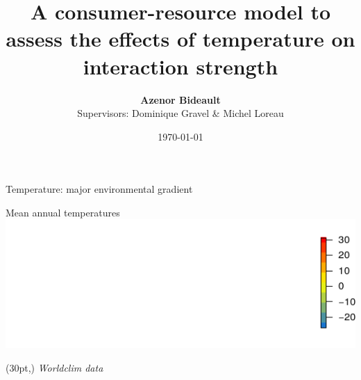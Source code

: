 \documentclass[11pt, compress, aspectratio=1610]{beamer}
\title{A consumer-resource model to assess the effects of temperature on
interaction strength}
\subtitle{}
\date{\today}
\author{\textbf{Azenor Bideault}\\
Supervisors: Dominique Gravel \& Michel Loreau \newline}
\institute{Université de Sherbooke}
\newcommand\smallcitation[1]{%
\begin{textblock*}{\textwidth}(30pt,\textheight)
    \raggedleft \small\textit{#1}
\end{textblock*}}
\begin{document}
\maketitle

\begin{frame}{Temperature: major environmental gradient}

\centering
Mean annual temperatures
\includegraphics[width=1\linewidth]{figuresAz/AnmeanTempST.pdf}
\smallcitation{Worldclim data}

\end{frame}
\end{document}
